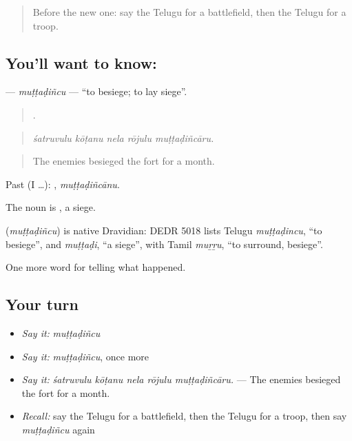 \label{lesson:TE-C361-muttadincu}



\begin{quote}
Before the new one: say the Telugu for a battlefield, then the Telugu for a troop.
\end{quote}

\subsection*{You'll want to know: }
\textbf{} — \emph{muṭṭaḍiñcu} — \textquotedblleft{}to besiege; to lay siege\textquotedblright{}.

\begin{quote}
    .
\end{quote}

\begin{quote}
\emph{śatruvulu kōṭanu nela rōjulu muṭṭaḍiñcāru.}
\end{quote}

\begin{quote}
The enemies besieged the fort for a month.
\end{quote}

Past (I …): , \emph{muṭṭaḍiñcānu}.

The noun is , a siege.

\begin{cousinweb}
\textbf{} (\emph{muṭṭaḍiñcu}) is native Dravidian: DEDR 5018 lists Telugu \emph{muṭṭaḍincu}, \textquotedblleft{}to besiege\textquotedblright{}, and \emph{muṭṭaḍi}, \textquotedblleft{}a siege\textquotedblright{}, with Tamil \emph{muṟṟu}, \textquotedblleft{}to surround, besiege\textquotedblright{}.
\end{cousinweb}

\begin{grammarlens}[title={What you've built}]
One more word for telling what happened.
\end{grammarlens}

\subsection*{Your turn}
\begin{itemize}
\raggedright
  \item \emph{Say it:} \emph{muṭṭaḍiñcu}
  \item \emph{Say it:} \emph{muṭṭaḍiñcu}, once more
  \item \emph{Say it:} \emph{śatruvulu kōṭanu nela rōjulu muṭṭaḍiñcāru.} — The enemies besieged the fort for a month.
  \item \emph{Recall:} say the Telugu for a battlefield, then the Telugu for a troop, then say \emph{muṭṭaḍiñcu} again
\end{itemize}


